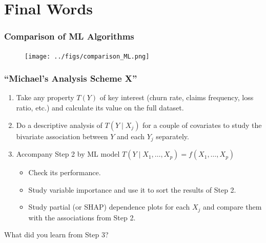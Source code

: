 \documentclass[
    utf8,
    aspectratio=169
]{beamer}  %
\begin{document}
\section{Final Words}

\begin{frame}
	\frametitle{Comparison of ML Algorithms}
		\begin{figure}
		\texttt{[image: ../figs/comparison\_ML.png]}
	\end{figure}
\end{frame}

\begin{frame}
	\frametitle{``Michael’s Analysis Scheme X''}
	\begin{enumerate}
		\item Take any property $T(Y)$ of key interest (churn rate, claims frequency, loss ratio, etc.) and calculate its value on the full dataset.
		\item Do a descriptive analysis of $T(Y \mid X_j)$ for a couple of covariates to study the bivariate association between $Y$ and each $Y_j$ separately.
		\item Accompany Step 2 by ML model $T(Y\mid X_1, \dots, X_p)=f(X_1, \dots, X_p)$
			\begin{itemize}
				\item Check its performance.
				\item Study variable importance and use it to sort the results of Step 2.
				\item Study partial (or SHAP) dependence plots for each $X_j$ and compare them with the associations from Step 2.
			\end{itemize}
	\end{enumerate}

	\begin{block}{What did you learn from Step 3?}
	\end{block}
\end{frame}

\end{document}
